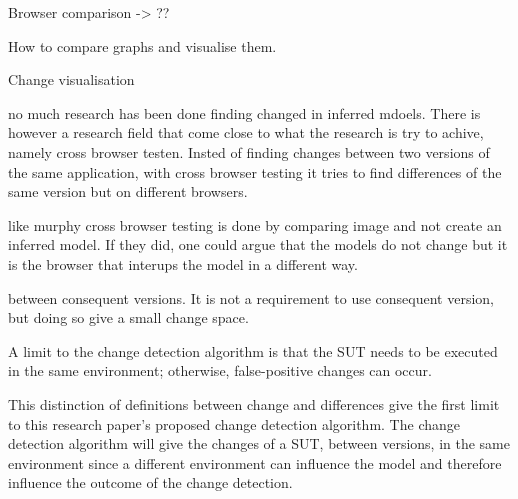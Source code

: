 Browser comparison -> ??

How to compare graphs and visualise them. 

Change visualisation


no much research has been done finding changed in inferred mdoels. There is however a research field that come close to what the research is try to achive, namely cross browser testen. Insted of finding changes between two versions of the same application, with cross browser testing it tries to find differences of the same version but on different browsers.

like murphy cross browser testing is done by comparing image and not create an inferred model. If they did, one could argue that the models do not change but it is the browser that interups the model in a different way. 




between consequent versions. It is not a requirement to use consequent version, but doing so give a small change space. 


A limit to the change detection algorithm is that the SUT needs to be executed in the same environment; otherwise, false-positive changes can occur.

This distinction of definitions between change and differences give the first limit to this research paper's proposed change detection algorithm. The change detection algorithm will give the changes of a SUT, between versions, in the same environment since a different environment can influence the model and therefore influence the outcome of the change detection.